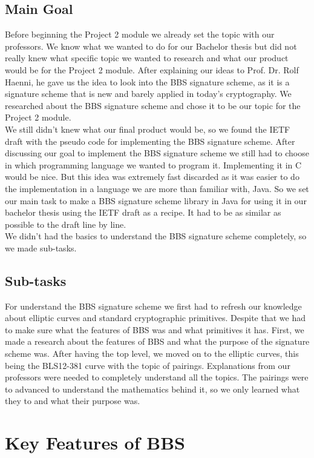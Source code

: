\documentclass{article}
\begin{document}
\subsection{Main Goal}
Before beginning the Project 2 module we already set the topic with our professors. We know what we wanted to do for our Bachelor thesis but did not really knew what specific topic we wanted to research and what our product would be for the Project 2 module. After explaining our ideas to Prof. Dr. Rolf Haenni, he gave us the idea to look into the BBS signature scheme, as it is a signature scheme that is new and barely applied in today's cryptography. We researched about the BBS signature scheme and chose it to be our topic for the Project 2 module. \\
We still didn't knew what our final product would be, so we found the IETF draft with the pseudo code for implementing the BBS signature scheme. After discussing our goal to implement the BBS signature scheme we still had to choose in which programming language we wanted to program it. Implementing it in C would be nice. But this idea was extremely fast discarded as it was easier to do the implementation in a language we are more than familiar with, Java.
So we set our main task to make a BBS signature scheme library in Java for using it in our bachelor thesis using the IETF draft as a recipe. It had to be as similar as possible to the draft line by line. \\
We didn't had the basics to understand the BBS signature scheme completely, so we made sub-tasks.

\subsection{Sub-tasks}
For understand the BBS signature scheme we first had to refresh our knowledge about elliptic curves and standard cryptographic primitives. Despite that we had to make sure what the features of \gls{BBS} was and what primitives it has.
First, we made a research about the features of \gls{BBS} and what the purpose of the signature scheme was. After having the top level, we moved on to the elliptic curves, this being the BLS12-381 curve with the topic of pairings. Explanations from our professors were needed to  completely understand all the topics. The pairings were to advanced to understand the mathematics behind it, so we only learned what they to and what their purpose was. 


\section{Key Features of BBS}
\end{document}

